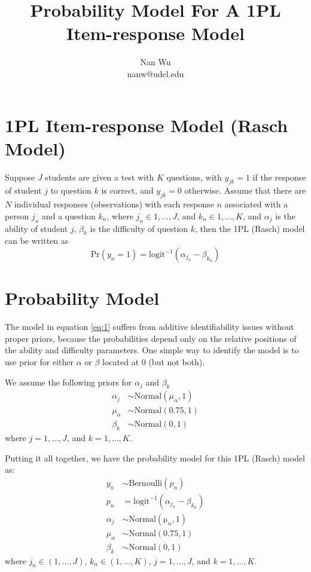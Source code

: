 \documentclass[12pt]{article}
\begin{document}
\title{Probability Model For A 1PL Item-response Model}
\author{Nan Wu \\ nanw@udel.edu}
\date{}
\maketitle

\section{1PL Item-response Model (Rasch Model)}

Suppose $J$ students are given a test with $K$ questions, with $y_{jk}=1$ if the response of student $j$ to question $k$ is correct, and  $y_{jk}=0$ otherwise. Assume that there are $N$ individual responses (observations) with each response $n$ associated with a person $j_n$ and a question $k_n$, where $j_n\in{1,\ldots, J}$, and $k_n\in{1, \ldots, K}$, and $\alpha_j$ is the ability of student $j$, $\beta_k$ is the difficulty of question $k$, then the 1PL (Rasch) model can be written as
\begin{equation} \label{eq:1}
  \mathrm{Pr}\left(y_n=1\right)=\mathrm{logit}^{-1}\left(\alpha_{j_n} - \beta_{k_n}\right)
\end{equation}

\section{Probability Model}

The model in equation \ref{eq:1} suffers from additive identifiability issues without proper priors, because the probabilities depend only on the relative positions of the ability and difficulty parameters. One simple way to identify the model is to use prior for either $\alpha$ or $\beta$ located at 0 (but not both).

We assume the following priors for $\alpha_j$ and $\beta_k$
\begin{align*}
  \alpha_j &\sim \mathrm{Normal}\left(\mu_\alpha,1\right)\\
  \mu_\alpha &\sim \mathrm{Normal} \left(0.75, 1\right) \\
  \beta_k &\sim \mathrm{Normal} \left(0, 1\right)
\end{align*}
where $j=1, \ldots, J$, and $k=1, \ldots, K$.

Putting it all together, we have the probability model for this 1PL (Rasch) model as:
\begin{align*}
  y_n &\sim \mathrm{Bernoulli}\left(p_n\right) \\
  p_n &= \mathrm{logit}^{-1}\left(\alpha_{j_n}-\beta_{k_n}\right) \\
  \alpha_j &\sim \mathrm{Normal\left(\mu_\alpha, 1 \right)}\\
  \mu_\alpha &\sim \mathrm{Normal} \left(0.75, 1\right) \\
  \beta_k &\sim \mathrm{Normal} \left(0, 1\right)
\end{align*}
where $j_n \in \left(1,\ldots,J \right)$, $k_n \in \left(1,\ldots,K \right)$, $j=1,\ldots, J$, and $k=1,\ldots,K$.
\end{document}
